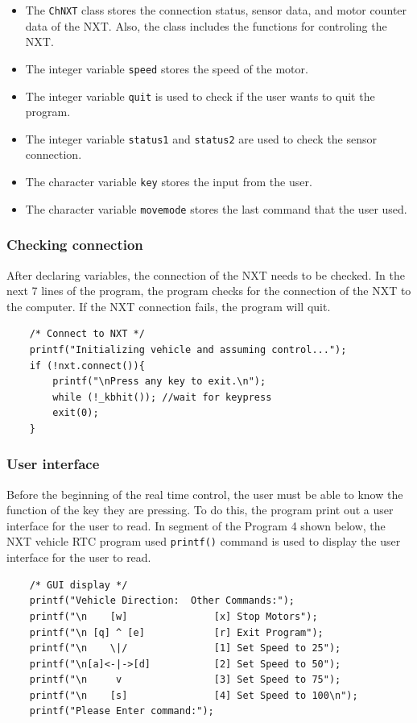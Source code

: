 \begin{itemize}
\item The \verb+ChNXT+ class stores the connection status, sensor data, and motor counter data of the
    NXT. Also, the class includes the functions for controling the NXT.
\item The integer variable \verb+speed+ stores the speed of the motor.
\item The integer variable \verb+quit+ is used to check if the user wants to quit the program.
\item The integer variable \verb+status1+ and \verb+status2+ are used to check the sensor connection.
\item The character variable \verb+key+ stores the input from the user.
\item The character variable \verb+movemode+ stores the last command that the user used.
\end{itemize}

\subsubsection*{Checking connection}
After declaring variables, the connection of the NXT needs to be checked.
In the next 7 lines of the program, the program checks for the connection of the NXT to the computer.
If the NXT connection fails, the program will quit.
\begin{verbatim}
    /* Connect to NXT */
    printf("Initializing vehicle and assuming control...");
    if (!nxt.connect()){
        printf("\nPress any key to exit.\n");
        while (!_kbhit()); //wait for keypress
        exit(0);
    }
\end{verbatim}

\subsubsection*{User interface}
Before the beginning of the real time control, the user must be able to know the function of the key 
they are pressing. To do this, the program print out a user interface for the user to read. 
In segment of the Program 4 shown below, the NXT vehicle RTC program used \verb+printf()+ command is 
used to display the user interface for the user to read.
\begin{verbatim}
    /* GUI display */
    printf("Vehicle Direction:  Other Commands:");
    printf("\n    [w]               [x] Stop Motors");
    printf("\n [q] ^ [e]            [r] Exit Program");
    printf("\n    \|/               [1] Set Speed to 25");
    printf("\n[a]<-|->[d]           [2] Set Speed to 50");
    printf("\n     v                [3] Set Speed to 75");
    printf("\n    [s]               [4] Set Speed to 100\n");
    printf("Please Enter command:");
\end{verbatim}

